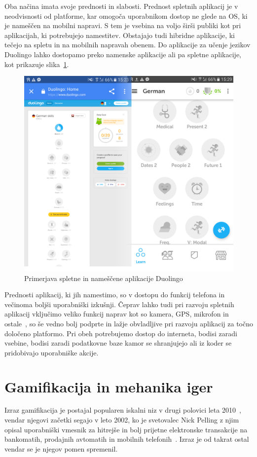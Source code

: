 \documentclass[a4paper, 12pt]{book}
\begin{document}
Oba načina imata svoje prednosti in slabosti. Prednost spletnih aplikacij je v neodvisnosti od platforme, kar omogoča uporabnikom dostop ne glede na OS, ki je nameščen na mobilni napravi. S tem je vsebina na voljo širši publiki kot pri aplikacijah, ki potrebujejo namestitev. 
Obstajajo tudi hibridne aplikacije, ki tečejo na spletu in na mobilnih napravah obenem. Do aplikacije za učenje jezikov Duolingo lahko dostopamo preko namenske aplikacije ali pa spletne aplikacije, kot prikazuje slika~\ref{web_native}.
\begin{figure}[H]
\centering
\includegraphics[height=0.7\textwidth]{slike/duoduo}
\caption{Primerjava spletne in nameščene aplikacije Duolingo}\label{web_native}
\end{figure}
Prednosti aplikacij, ki jih namestimo, so v dostopu do funkcij telefona in večinoma boljši uporabniški izkušnji. Čeprav lahko tudi pri razvoju spletnih aplikacij vključimo veliko funkcij naprav kot so kamera, GPS, mikrofon in ostale~\cite{cando}, so še vedno bolj podprte in lažje obvladljive pri razvoju aplikacij za točno določeno platformo. Pri obeh potrebujemo dostop do interneta, bodisi zaradi vsebine, bodisi zaradi podatkovne baze kamor se shranjujejo ali iz koder se pridobivajo uporabniške akcije.
\chapter{Gamifikacija in mehanika iger}
\label{ch3}
Izraz gamifikacija je postajal popularen iskalni niz v drugi polovici leta 2010~\cite{trend}, vendar njegovi začetki segajo v leto 2002, ko je svetovalec Nick Pelling z njim opisal uporabniški vmesnik za hitrejše in bolj prijetne elektronske transakcije na bankomatih, prodajnih avtomatih in mobilnih telefonih~\cite{conundra}. Izraz je od takrat ostal vendar se je njegov pomen spremenil.
\end{document}

